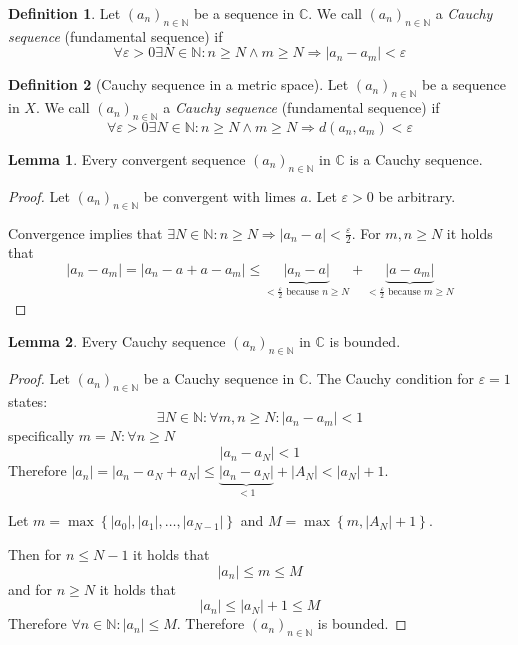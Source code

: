 \documentclass[a4paper,landscape,twocolumn]{article}
\theoremstyle{definition}
\newtheorem{defi}{Definition}
\newtheorem{lemma}{Lemma}
\newcommand\set[1]{\left\{#1\right\}}
\newcommand\abs[1]{\left|#1\right|}
\newcommand\seq[1]{{\left(#1\right)}_{n \in \mathbb N}}
\begin{document}
\begin{defi}
  Let $\seq{a_n}$ be a sequence in $\mathbb C$.
  We call $\seq{a_n}$ a \emph{Cauchy sequence} (fundamental sequence) if
  \[ \forall \varepsilon > 0 \exists N \in \mathbb N: n \geq N \land m \geq N \Rightarrow \abs{a_n - a_m} < \varepsilon \]
\end{defi}
\begin{defi}[Cauchy sequence in a metric space]
  Let $\seq{a_n}$ be a sequence in $X$.
  We call $\seq{a_n}$ a \emph{Cauchy sequence} (fundamental sequence) if
  \[ \forall \varepsilon > 0 \exists N \in \mathbb N: n \geq N \land m \geq N \Rightarrow d(a_n, a_m) < \varepsilon \]
\end{defi}

\begin{lemma}
  Every convergent sequence $\seq{a_n}$ in $\mathbb C$ is a Cauchy sequence.
\end{lemma}
\begin{proof}
  Let $\seq{a_n}$ be convergent with limes $a$.
  Let $\varepsilon > 0$ be arbitrary.

  Convergence implies that $\exists N \in \mathbb N: n \geq N \Rightarrow \abs{a_n - a} < \frac\varepsilon2$.
  For $m,n \geq N$ it holds that
  \[
      \abs{a_n - a_m}
      = \abs{a_n - a + a - a_m}
      \leq \underbrace{\abs{a_n - a}}_{< \frac\varepsilon2 \text{ because } n \geq N} + \underbrace{\abs{a - a_m}}_{< \frac\varepsilon2 \text{ because } m \geq N}
  \]
\end{proof}

\begin{lemma}
  Every Cauchy sequence $\seq{a_n}$ in $\mathbb C$ is bounded.
\end{lemma}
\begin{proof}
  Let $\seq{a_n}$ be a Cauchy sequence in $\mathbb C$.
  The Cauchy condition for $\varepsilon = 1$ states:
  \[ \exists N \in \mathbb N: \forall m,n \geq N: \abs{a_n - a_m} < 1 \]
  specifically $m = N: \forall n \geq N$
  \[ \abs{a_n - a_N} < 1 \]
  Therefore $\abs{a_n} = \abs{a_n - a_N + a_N} \leq \underbrace{\abs{a_n - a_N}}_{<1} + \abs{A_N} < \abs{a_N} + 1$.

  Let $m = \max\set{\abs{a_0}, \abs{a_1}, \dots, \abs{a_{N-1}}}$
  and $M = \max\set{m, \abs{A_N} + 1}$.

  Then for $n \leq N - 1$ it holds that
  \[ \abs{a_n} \leq m \leq M \]
  and for $n \geq N$ it holds that
  \[ \abs{a_n} \leq \abs{a_N} + 1 \leq M \]
  Therefore $\forall n \in \mathbb N: \abs{a_n} \leq M$.
  Therefore $\seq{a_n}$ is bounded.
\end{proof}
\end{document}
